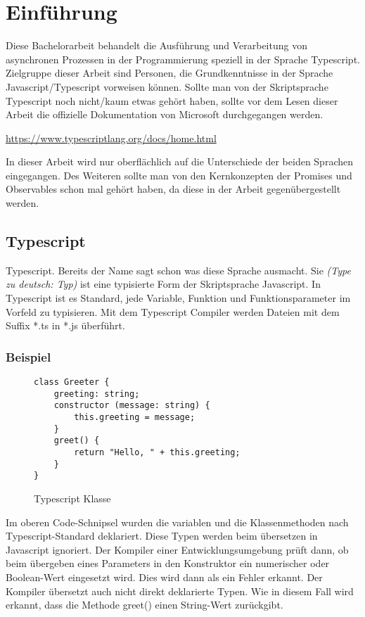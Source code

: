 \setcounter{secnumdepth}{1}
\section{Einführung}
Diese Bachelorarbeit behandelt die Ausführung und Verarbeitung von asynchronen Prozessen in der Programmierung speziell in der Sprache Typescript.\\

\noindent
Zielgruppe dieser Arbeit sind Personen, die Grundkenntnisse in der Sprache Javascript/Typescript vorweisen können.
Sollte man von der Skriptsprache Typescript noch nicht/kaum etwas gehört haben, sollte vor dem Lesen dieser Arbeit die offizielle Dokumentation von Microsoft durchgegangen werden.

\begin{center}
\url{https://www.typescriptlang.org/docs/home.html} 
\end{center}

\noindent
In dieser Arbeit wird nur oberflächlich auf die Unterschiede der beiden Sprachen eingegangen. Des Weiteren sollte man von den Kernkonzepten der Promises und Observables schon mal gehört haben, da diese in der Arbeit gegenübergestellt werden.

\subsection{Typescript}
Typescript. Bereits der Name sagt schon was diese Sprache ausmacht. Sie \textit{(\glqq{}Type\grqq{} zu deutsch: Typ)} ist eine typisierte Form der Skriptsprache Javascript. In Typescript ist es Standard, jede Variable, Funktion und Funktionsparameter im Vorfeld zu typisieren. Mit dem Typescript Compiler werden Dateien mit dem Suffix *.ts in *.js überführt.

\subsubsection{Beispiel}

\begin{figure}[h!]
\begin{lstlisting}
class Greeter {
    greeting: string;
    constructor (message: string) {
        this.greeting = message;
    }
    greet() {
        return "Hello, " + this.greeting;
    }
}  
\end{lstlisting}
\caption{Typescript Klasse \cite{typescript-example}}
\end{figure}

\noindent
Im oberen Code-Schnipsel wurden die variablen und die Klassenmethoden nach Typescript-Standard deklariert. Diese Typen werden beim übersetzen in Javascript ignoriert. Der Kompiler einer Entwicklungsumgebung prüft dann, ob beim übergeben eines Parameters in den Konstruktor ein numerischer oder Boolean-Wert eingesetzt wird. Dies wird dann als ein Fehler erkannt. Der Kompiler übersetzt auch nicht direkt deklarierte Typen. Wie in diesem Fall wird erkannt, dass die Methode greet() einen String-Wert zurückgibt.

